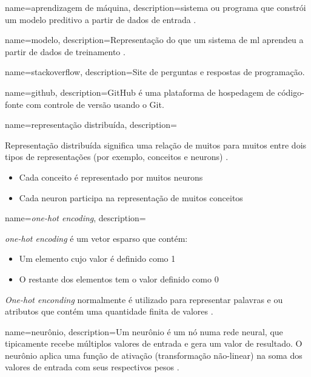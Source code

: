 {
    name=aprendizagem de máquina,
    description={sistema ou programa que constrói um modelo preditivo a partir de dados de entrada \citep{glossary-ml}.}
}

{
    name=modelo,
    description={Representação do que um sistema de \gls{ml} aprendeu a partir de dados de treinamento \citep{glossary-ml}.}
}

{
    name=stackoverflow,
    description={Site de perguntas e respostas de programação.}
}

{
    name=github,
    description={GitHub é uma plataforma de hospedagem de código-fonte com controle de versão usando o Git.}
}

{
    name=representação distribuída,
    description={Representação distribuída significa uma relação de muitos para muitos entre dois tipos de representações (por exemplo, conceitos e \gls{neuron}s) \citep{Hinton-distributed-representatons:1986}. 
    \begin{itemize}
        \item Cada conceito é representado por muitos \gls{neuron}s
        \item Cada \gls{neuron} participa na representação de muitos conceitos
    \end{itemize}
    }
}

{
    name=\textit{one-hot encoding},
    description={\textit{one-hot encoding} é um vetor esparso que contém:
    \begin{itemize}
        \item Um elemento cujo valor é definido como 1
        \item O restante dos elementos tem o valor definido como 0
    \end{itemize}
    \textit{One-hot enconding} normalmente é utilizado para representar palavras e ou atributos que contém uma quantidade finita de valores \citep{glossary-ml}.
    }
}

{
    name=neurônio,
    description={Um neurônio é um nó numa rede neural, que tipicamente recebe múltiplos valores de entrada e gera um valor de resultado. O neurônio aplica uma função de ativação (transformação não-linear) na soma dos valores de entrada com seus respectivos pesos \citep{glossary-ml}.}
}


